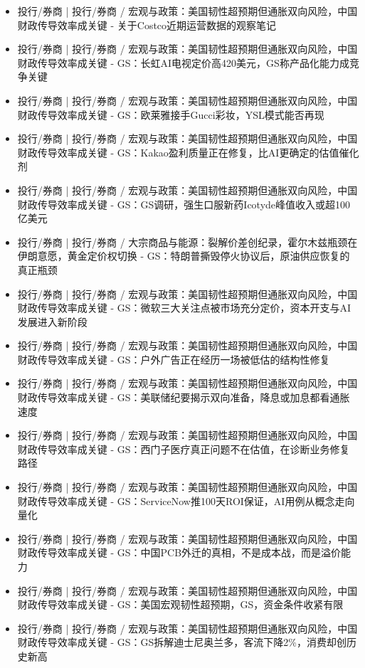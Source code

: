 \documentclass[11pt]{ctexart}
\begin{document}
\begin{itemize}
  \item [R067] 投行/券商 | 投行/券商 / 宏观与政策：美国韧性超预期但通胀双向风险，中国财政传导效率成关键 - 关于Costco近期运营数据的观察笔记
  \item [R068] 投行/券商 | 投行/券商 / 宏观与政策：美国韧性超预期但通胀双向风险，中国财政传导效率成关键 - GS：长虹AI电视定价高420美元，GS称产品化能力成竞争关键
  \item [R069] 投行/券商 | 投行/券商 / 宏观与政策：美国韧性超预期但通胀双向风险，中国财政传导效率成关键 - GS：欧莱雅接手Gucci彩妆，YSL模式能否再现
  \item [R070] 投行/券商 | 投行/券商 / 宏观与政策：美国韧性超预期但通胀双向风险，中国财政传导效率成关键 - GS：Kakao盈利质量正在修复，比AI更确定的估值催化剂
  \item [R071] 投行/券商 | 投行/券商 / 宏观与政策：美国韧性超预期但通胀双向风险，中国财政传导效率成关键 - GS：GS调研，强生口服新药Icotyde峰值收入或超100亿美元
  \item [R072] 投行/券商 | 投行/券商 / 大宗商品与能源：裂解价差创纪录，霍尔木兹瓶颈在伊朗意愿，黄金定价权切换 - GS：特朗普撕毁停火协议后，原油供应恢复的真正瓶颈
  \item [R073] 投行/券商 | 投行/券商 / 宏观与政策：美国韧性超预期但通胀双向风险，中国财政传导效率成关键 - GS：微软三大关注点被市场充分定价，资本开支与AI发展进入新阶段
  \item [R074] 投行/券商 | 投行/券商 / 宏观与政策：美国韧性超预期但通胀双向风险，中国财政传导效率成关键 - GS：户外广告正在经历一场被低估的结构性修复
  \item [R075] 投行/券商 | 投行/券商 / 宏观与政策：美国韧性超预期但通胀双向风险，中国财政传导效率成关键 - GS：美联储纪要揭示双向准备，降息或加息都看通胀速度
  \item [R076] 投行/券商 | 投行/券商 / 宏观与政策：美国韧性超预期但通胀双向风险，中国财政传导效率成关键 - GS：西门子医疗真正问题不在估值，在诊断业务修复路径
  \item [R077] 投行/券商 | 投行/券商 / 宏观与政策：美国韧性超预期但通胀双向风险，中国财政传导效率成关键 - GS：ServiceNow推100天ROI保证，AI用例从概念走向量化
  \item [R078] 投行/券商 | 投行/券商 / 宏观与政策：美国韧性超预期但通胀双向风险，中国财政传导效率成关键 - GS：中国PCB外迁的真相，不是成本战，而是溢价能力
  \item [R079] 投行/券商 | 投行/券商 / 宏观与政策：美国韧性超预期但通胀双向风险，中国财政传导效率成关键 - GS：美国宏观韧性超预期，GS，资金条件收紧有限
  \item [R080] 投行/券商 | 投行/券商 / 宏观与政策：美国韧性超预期但通胀双向风险，中国财政传导效率成关键 - GS：GS拆解迪士尼奥兰多，客流下降2\%，消费却创历史新高

\end{itemize}
\end{document}
